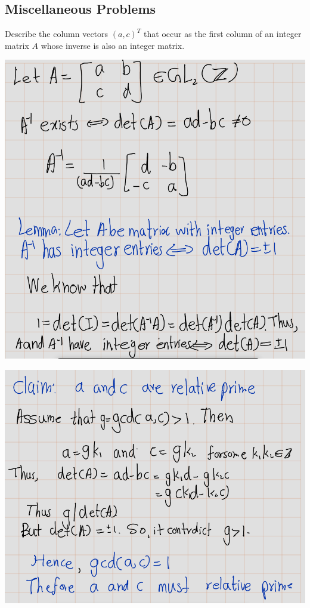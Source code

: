 \documentclass[
]{book}
\begin{document}
\hypertarget{miscellaneous-problems}{%
\subsection{Miscellaneous Problems}\label{miscellaneous-problems}}

\leavevmode{}%
Describe the column vectors \((a, c)^T\) that occur as the first column
of an integer matrix \(A\) whose inverse is also an integer matrix.

\includegraphics{figures/ch_2/fig47.png}

\includegraphics{figures/ch_2/fig48.png}
\end{document}
